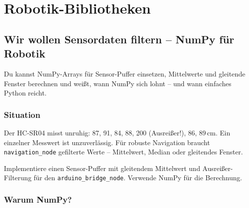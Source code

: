 
\part{Robotik-Bibliotheken}

\chapter{Wir wollen Sensordaten filtern – NumPy für Robotik}

\begin{lernziele}
Du kannst NumPy-Arrays für Sensor-Puffer einsetzen,
Mittelwerte und gleitende Fenster berechnen und weißt,
wann NumPy sich lohnt -- und wann einfaches Python reicht.
\end{lernziele}

\section{Situation}

Der HC-SR04 misst unruhig: 87, 91, 84, 88, 200 (Ausreißer!), 86, 89\,cm.
Ein einzelner Messwert ist unzuverlässig.
Für robuste Navigation braucht \texttt{navigation\_node}
gefilterte Werte -- Mittelwert, Median oder gleitendes Fenster.

\begin{aufgabeBox}
Implementiere einen Sensor-Puffer mit gleitendem Mittelwert
und Ausreißer-Filterung für den \texttt{arduino\_bridge\_node}.
Verwende NumPy für die Berechnung.
\end{aufgabeBox}

\section{Warum NumPy?}

